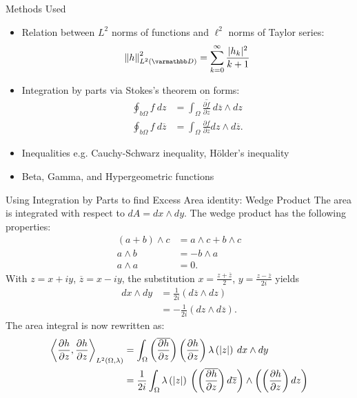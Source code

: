 \documentclass{reu_beamer}
\begin{document}
\begin{frame}{Methods Used}
    \begin{itemize}
        \item Relation between $L^{2}$ norms of functions and $\ell^{2}$ norms of Taylor series:
        \[\norm{h}^2_{L^2(\mathbb{D})} = \sum^\infty_{k = 0} \frac{|h_k|^2}{k+1}\]
        \item Integration by parts via Stokes's theorem on forms:
        \begin{align*}
            \oint_{b\Omega}f\: dz &= \int_{\Omega} \overline{\frac{\partial f}{\partial z}}\:d\overline{z}\wedge dz\\
            \oint_{b\Omega}f\:d\overline{z} &= \int_{\Omega}\frac{\partial f}{\partial z}dz\wedge d\overline{z}.
        \end{align*}
        \item Inequalities e.g. Cauchy-Schwarz inequality, H\"{o}lder's inequality 
        \item Beta, Gamma, and Hypergeometric functions 
    \end{itemize}
\end{frame}
\begin{frame}[allowframebreaks]{Using Integration by Parts to find Excess Area identity: Wedge Product}
  The area is integrated with respect to $dA = dx \wedge dy$. The wedge product has the following properties:
  \begin{align*}
    \left(a+b\right)\wedge c &= a\wedge c + b\wedge c\\
    a\wedge b &= -b\wedge a\\
    a\wedge a &= 0.
  \end{align*}
  With $z = x + iy$, $\overline{z} = x-iy$, the substitution $x = \frac{z + \overline{z}}{2}$, $y = \frac{z - \overline{z}}{2i}$ yields
  \begin{align*}
    dx\wedge dy &= \frac{1}{2i}\left(d\overline{z}\wedge dz\right)\\
                &= -\frac{1}{2i}\left(dz \wedge d\overline{z}\right).
  \end{align*}
  The area integral is now rewritten as:
  \begin{align*}
    \left\langle \frac{\partial h}{\partial z},\frac{\partial h}{\partial z} \right\rangle_{L^{2}\left(\Omega,\lambda\right)} &= \int_{\Omega}^{} \left(\overline{\frac{\partial h}{\partial z}}\right)\left(\frac{\partial h}{\partial z}\right)\lambda\left(|z|\right)\:dx\wedge dy\\
                                                                                                            &= \frac{1}{2i}\int_{\Omega}^{} \lambda\left(|z|\right)\:\left(\left(\overline{\frac{\partial h}{\partial z}}\right)d\overline{z}\right)\wedge \left(\left(\frac{\partial h}{\partial z}\right)dz\right)
  \end{align*}
\end{frame}
\end{document}
